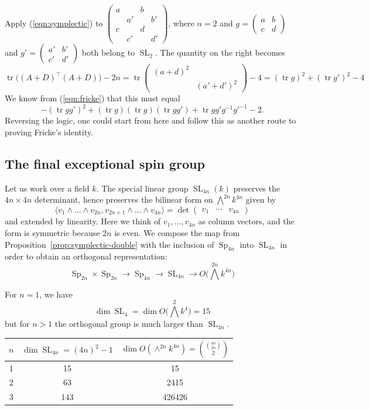 \documentclass[11pt]{amsart}
\theoremstyle{definition}
\numberwithin{figure}{section}
\numberwithin{equation}{section}
\numberwithin{table}{section}
\newcommand{\SL}{\operatorname{SL}}
\newcommand{\Sp}{\operatorname{Sp}}
\newcommand{\tr}{\operatorname{tr}}
\begin{document}
Apply (\ref{eqn:symplectic}) to $\begin{pmatrix} a & & b & \\ & a' & & b'\\ c & & d & \\ & c' & & d' \end{pmatrix}$, where $n=2$ and $g=\begin{pmatrix} a & b \\ c & d \end{pmatrix}$ and $g'=\begin{pmatrix} a' & b' \\  c' & d' \end{pmatrix}$ both belong to $\SL_2$.
The quantity on the right becomes
\[
\tr\big( (A+D)^{\top}(A+D) \big) -2n = \tr \begin{pmatrix} (a+d)^2 & \\ & (a'+d')^2 \end{pmatrix}-4 = (\tr{g})^2+(\tr{g'})^2-4
\]
We know from (\ref{eqn:fricke}) that this must equal
\[
-(\tr{gg'})^2+(\tr{g})(\tr{g})(\tr{gg'})+\tr{gg'g^{-1}g'^{-1}}-2.
\]
Reversing the logic, one could start from here and follow this as another route to proving Fricke's identity.

\subsection{The final exceptional spin group}

Let us work over a field $k$.
The special linear group $\SL_{4n}(k)$ preserves the $4n\times 4n$ determinant, hence preserves the bilinear form on $\bigwedge^{2n} k^{4n}$ given by
\[
\langle v_1 \wedge \ldots \wedge v_{2n}, v_{2n+1} \wedge \ldots \wedge v_{4n} \rangle = \det \begin{pmatrix} v_1 & \cdots & v_{4n} \end{pmatrix}
\]
and extended by linearity.
Here we think of $v_1,\ldots,v_{4n}$ as column vectors, and the form is symmetric because $2n$ is even.
We compose the map from Proposition~\ref{prop:symplectic-double} with the inclusion of $\Sp_{4n}$ into $\SL_{4n}$ in order to obtain an orthogonal representation:
\[
\Sp_{2n} \times \Sp_{2n} \rightarrow \Sp_{4n} \rightarrow \SL_{4n} \rightarrow O\big({\bigwedge}^{2n} k^{4n} \big)
\]


For $n=1$, we have
\[
\dim \SL_{4} = \dim O\big( {\bigwedge}^2 k^4 \big) = 15
\]
but for $n > 1$ the orthogonal group is much larger than $\SL_{4n}$.
\begin{center}
\begin{tabular}{c|c|c}
$n$ & $\dim \SL_{4n} = (4n)^2-1$ & $\dim O(\wedge^{2n} k^{4n})= \binom{\binom{4n}{2n}}{2}$ \\ \hline
1 & 15 & 15 \\
2 & 63 & 2415 \\
3 & 143 & 426426 \\
\end{tabular}
\end{center}
\end{document}
